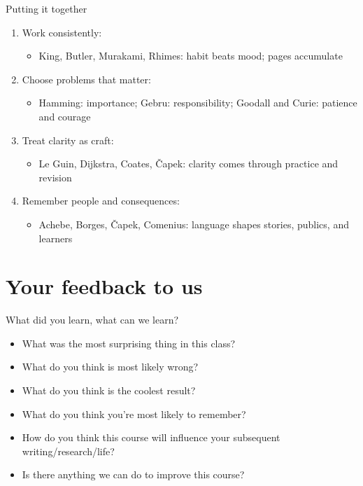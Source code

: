 \documentclass[aspectratio=169]{beamer}
\begin{document}
\begin{frame}{Putting it together}
  \begin{enumerate}
    \item Work consistently:
      \begin{itemize}
        \item King, Butler, Murakami, Rhimes: habit beats mood; pages accumulate
      \end{itemize}

    \item Choose problems that matter:
      \begin{itemize}
        \item Hamming: importance; Gebru: responsibility; Goodall and Curie: patience and courage
      \end{itemize}

    \item Treat clarity as craft:
      \begin{itemize}
        \item Le Guin, Dijkstra, Coates, \v{C}apek: clarity comes through practice and revision
      \end{itemize}

    \item Remember people and consequences:
      \begin{itemize}
        \item Achebe, Borges, \v{C}apek, Comenius: language shapes stories, publics, and learners
      \end{itemize}
  \end{enumerate}
\end{frame}



\section{Your feedback to us}

\begin{frame}{What did you learn, what can we learn?}

\begin{itemize}
\item What was the most surprising thing in this
class?
\item What do you think is most likely wrong?
\item What do you think is the coolest result?
\item What do you think you’re most likely to
remember?
\item How do you think this course will influence
your subsequent writing/research/life?
\item Is there anything we can do to improve this course?
\end{itemize}

\end{frame}
\end{document}
